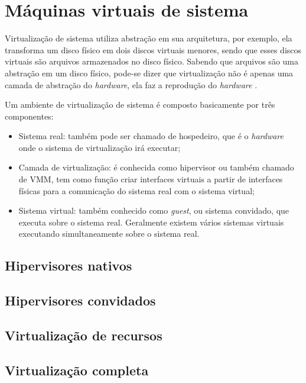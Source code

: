 \section{Máquinas virtuais de sistema}
\label{section:virtsistema}



Virtualização de sistema utiliza abstração em sua arquitetura, por exemplo, ela transforma um disco físico em dois discos 
virtuais menores, sendo que esses discos virtuais são arquivos armazenados no disco físico. Sabendo que arquivos são uma abstração
em um disco físico, pode-se dizer que virtualização não é apenas uma camada de abstração do \textit{hardware}, ela faz a reprodução 
do \textit{hardware} \cite{smithenair2005}.

Um ambiente de virtualização de sistema é composto basicamente por três componentes:
\begin{itemize}
 \item Sistema real: também pode ser chamado de hospedeiro, que é o \textit{hardware} onde o sistema de virtualização irá executar;
 \item Camada de virtualização: é conhecida como hipervisor ou também chamado de \ac{VMM}, tem como função criar interfaces virtuais a
 partir de interfaces físicas para a comunicação do sistema real com o sistema virtual;
 \item Sistema virtual: também conhecido como \textit{guest}, ou sistema convidado, que executa sobre o sistema real. Geralmente
 existem vários sistemas virtuais executando simultaneamente sobre o sistema real.
\end{itemize}


\subsection{Hipervisores nativos}
\subsection{Hipervisores convidados}

\subsection{Virtualização de recursos}
\subsection{Virtualização completa}



